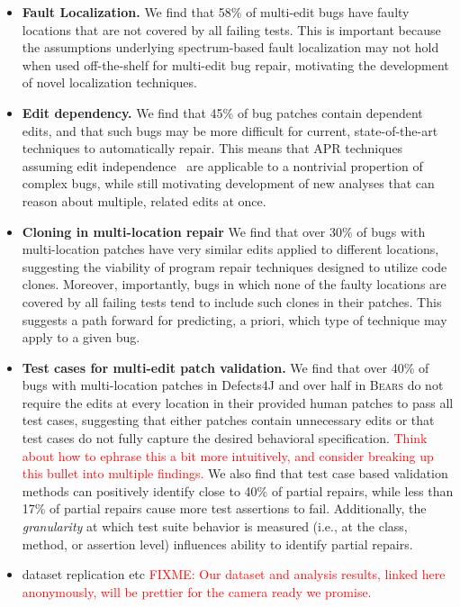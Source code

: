 \documentclass[10pt, conference]{IEEEtran}
\newcommand\todo[1]{\textcolor{red}{#1}}
\newcommand\bears{\textsc{Bears}\xspace}
\begin{document}
\begin{itemize}
\item \textbf{Fault Localization.}  We find that 58\% of multi-edit bugs have faulty locations that are not
  covered by all failing tests.  This is important because the assumptions underlying spectrum-based
  fault localization may not hold when used off-the-shelf for
  multi-edit bug repair, motivating the development of novel localization
  techniques. 
\item \textbf{Edit dependency.} We 
find that 45\% of bug patches contain dependent edits, and that such bugs
may be more difficult for current, state-of-the-art
techniques to automatically repair.  This means that APR techniques assuming edit
independence~\cite{hercules,theotherone} are applicable to a nontrivial propertion of complex bugs, while
still motivating development of new analyses that can reason about multiple,
related edits at once. 
\item \textbf{Cloning in multi-location repair} We find that over 30\% of bugs with multi-location
patches have very similar edits applied to different locations, suggesting the viability of 
program repair techniques designed to utilize code clones. Moreover, importantly, bugs in which 
none of the faulty locations are covered by all failing tests tend to include
such clones in their patches.  This suggests a path forward for predicting, a
priori, which type of technique may apply to a given bug. 
\item \textbf{Test cases for multi-edit patch validation.} We find that over 40\% of bugs with multi-location
  patches in Defects4J and over half in \bears do not require the edits at every
  location in their provided human patches to pass all test cases, suggesting
  that either patches contain unnecessary edits or that test cases
  do not fully capture the desired behavioral specification.  \todo{Think about
    how to ephrase this a bit more intuitively, and consider breaking up this
    bullet into multiple findings.} We also find that test 
  case based validation methods can positively identify close to 40\% of partial repairs,
  while less than
  17\% of partial repairs cause more test assertions to fail. Additionally, the 
  \emph{granularity} at which test suite behavior is measured (i.e., at the class,
  method, or assertion level) influences ability to identify partial
  repairs. 
\item dataset replication etc \todo{FIXME: Our dataset and analysis results,
    linked here anonymously, will be prettier for the camera ready we promise.}
\end{itemize}
\end{document}
